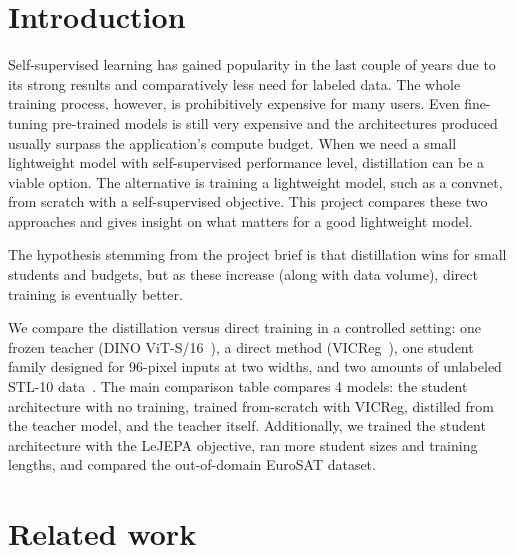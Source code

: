 \documentclass[letterpaper,11pt]{article}
\begin{document}
\section{Introduction}
\label{sec:intro}

Self-supervised learning has gained popularity in the last couple of years due to its strong results and comparatively less need for labeled data. The whole training process, however, is prohibitively expensive for many users. Even fine-tuning pre-trained models is still very expensive and the architectures produced usually surpass the application's compute budget. When we need a small lightweight model with self-supervised performance level, distillation can be a viable option. The alternative is training a lightweight model, such as a convnet, from scratch with a self-supervised objective. This project compares these two approaches and gives insight on what matters for a good lightweight model.

The hypothesis stemming from the project brief is that distillation wins for small students and budgets, but as these increase (along with data volume), direct training is eventually better. 

We compare the distillation versus direct training in a controlled setting: one frozen teacher (DINO ViT-S/16~\citep{caron2021dino}), a direct method (VICReg~\citep{bardes2022vicreg}), one student family designed for 96-pixel inputs at two widths, and two amounts of unlabeled STL-10 data~\citep{coates2011stl10}. The main comparison table compares 4 models: the student architecture with no training, trained from-scratch with VICReg, distilled from the teacher model, and the teacher itself. Additionally, we trained the student architecture with the LeJEPA objective, ran more student sizes and training lengths, and compared the out-of-domain EuroSAT dataset.

\section{Related work}
\label{sec:related}
\end{document}

